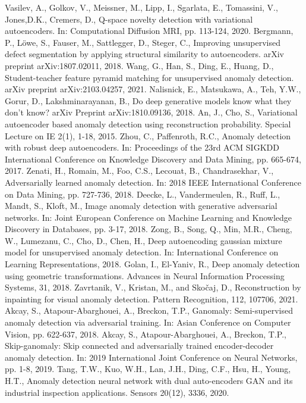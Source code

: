 \documentclass[letterpaper, 10 pt, conference]{ieeeconf}
\begin{document}
\begin{thebibliography}{99}
 Vasilev, A., Golkov, V., Meissner, M., Lipp, I., Sgarlata, E., Tomassini, V., Jones,D.K., Cremers, D., Q-space novelty detection with variational autoencoders. In: Computational Diffusion MRI, pp. 113-124, 2020.
 Bergmann, P., Löwe, S., Fauser,  M., Sattlegger, D., Steger, C., Improving unsupervised defect segmentation by applying structural similarity to autoencoders. arXiv preprint arXiv:1807.02011, 2018.
 Wang, G., Han, S., Ding, E., Huang, D., Student-teacher feature pyramid matching for unsupervised anomaly detection. arXiv preprint arXiv:2103.04257, 2021.
 Nalisnick, E., Matsukawa, A., Teh, Y.W., Gorur, D., Lakshminarayanan, B., Do deep generative models know what they don't know? arXiv Preprint arXiv:1810.09136, 2018.
 An, J., Cho, S., Variational autoencoder based anomaly detection using reconstruction probability. Special Lecture on IE 2(1), 1-18, 2015.
 Zhou, C., Paffenroth, R.C., Anomaly detection with robust deep autoencoders. In: Proceedings of the 23rd ACM SIGKDD International Conference on Knowledge Discovery and Data Mining, pp. 665-674, 2017.
 Zenati, H., Romain, M., Foo, C.S., Lecouat, B., Chandrasekhar, V., Adversarially learned anomaly detection. In:  2018 IEEE International Conference on Data Mining, pp. 727-736, 2018.
 Deecke, L., Vandermeulen, R., Ruff, L., Mandt, S., Kloft, M., Image anomaly detection with generative adversarial networks. In:  Joint European Conference on Machine Learning and Knowledge Discovery in Databases, pp. 3-17, 2018.
 Zong, B., Song, Q., Min, M.R., Cheng, W., Lumezanu, C., Cho, D., Chen, H., Deep autoencoding gaussian mixture model for unsupervised anomaly detection. In: International Conference on Learning Representations, 2018.
 Golan, I., El-Yaniv, R., Deep anomaly detection using geometric transformations. Advances in Neural Information Processing Systems, 31, 2018.
 Zavrtanik, V., Kristan, M., and Skočaj, D., Reconstruction by inpainting for visual anomaly detection. Pattern Recognition, 112, 107706, 2021.
 Akcay, S., Atapour-Abarghouei, A., Breckon, T.P., Ganomaly: Semi-supervised anomaly detection via adversarial training. In: Asian Conference on Computer Vision, pp. 622-637, 2018.
 Akcay, S., Atapour-Abarghouei, A., Breckon, T.P., Skip-ganomaly: Skip connected and adversarially trained encoder-decoder anomaly detection. In: 2019 International Joint Conference on Neural Networks, pp. 1-8, 2019.
 Tang, T.W., Kuo, W.H., Lan, J.H., Ding, C.F., Hsu, H., Young, H.T., Anomaly detection neural network with dual auto-encoders GAN and its industrial inspection applications. Sensors 20(12), 3336, 2020.

\end{thebibliography}
\end{document}
